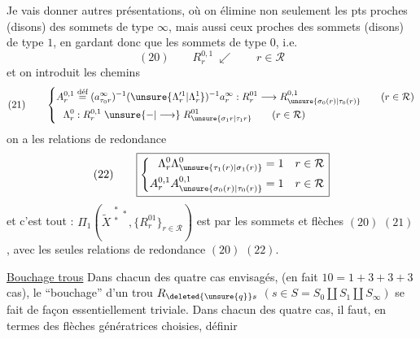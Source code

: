 
Je vais donner   autres présentations, où on élimine non seulement les pts proches (disons) des  sommets de type $\infty$,  mais aussi ceux proches des sommets (disons) de type $1$, en gardant donc que les sommets  de type $0$, i.e.
\[
(20)\qquad R_r^{0,1}\ \swarrow\qquad r\in\mathcal{R}
\]
et on introduit les chemins
\[
(21)\qquad\left\{\begin{aligned}
A_r^{0,1}&\overset{\text{déf}}{=}(a_{\tau_0r}^\infty)^{-1}(\unsure{\Lambda_r^{\prime1}|\Lambda_r^1})^{-1}a_r^\infty:R_r^{01}\longrightarrow R_{\unsure{\sigma_0(r)|\tau_0(r)}}^{0,1}\qquad(r\in\mathcal{R})\\
\Lambda_r^0&:R_r^{0,1}\mathrel{\unsure{-|\longrightarrow}} R_{\unsure{\sigma_1r|\tau_1r}}^{01}\qquad(r\in\mathcal{R})
\end{aligned}\right.
\]
on a les relations de redondance
\[
(22)\qquad\boxed{\left\{\begin{aligned}
\Lambda_r^0\Lambda_{\unsure{\tau_1(r)|\sigma_1(r)}}^0&=1&&r\in\mathcal{R}\\
A_r^{0,1}A_{\unsure{\sigma_0(r)|\tau_0(r)}}^{0,1}&=1&&r\in\mathcal{R}
\end{aligned}\right.}
\]
et c'est tout : $\Pi_1(\widetilde{X}^{\substack{*\\*}*},\{R_r^{01}\}_{r\in\mathcal{R}})$ est   par les sommets et flèches $(20)$ $(21)$, avec les seules relations de redondance $(20)$ $(22)$.

\uline{Bouchage  trous} Dans chacun des quatre cas envisagés, (en fait $10=1+3+3+3$ cas), le ``bouchage'' d'un trou $R_{\deleted{\unsure{q}}s}$ $(s\in S=S_0\amalg S_1\amalg S_\infty)$ se fait de façon essentiellement triviale. Dans chacun des quatre cas, il faut, en termes des flèches génératrices choisies, définir 

